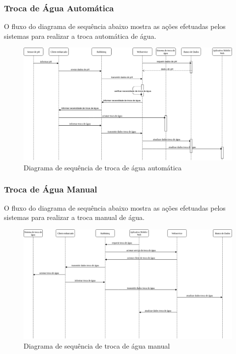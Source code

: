 \subsubsection{Troca de Água Automática}

O fluxo do diagrama de sequência abaixo mostra as ações efetuadas pelos sistemas para realizar a troca automática de água.

\begin{figure}[H]
	\centering
	\includegraphics[width=17cm]{figuras/troca_agua.png}
	\caption{Diagrama de sequência de troca de água automática} \label{troca_agua}
\end{figure}

\subsubsection{Troca de Água Manual}

O fluxo do diagrama de sequência abaixo mostra as ações efetuadas pelos sistemas para realizar a troca manual de água.

\begin{figure}[H]
	\centering
	\includegraphics[width=18cm]{figuras/troca_agua_manual.png}
	\caption{Diagrama de sequência de troca de água manual} \label{troca_agua_manual}
\end{figure}